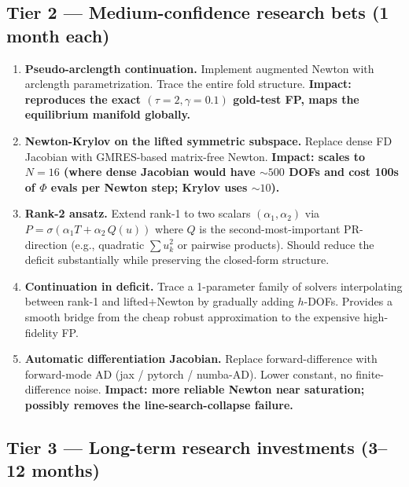 \documentclass[11pt]{article}
\begin{document}
\subsection{Tier 2 — Medium-confidence research bets (1 month each)}

\begin{enumerate}
\item \textbf{Pseudo-arclength continuation.} Implement augmented Newton with arclength
parametrization. Trace the entire fold structure. \textbf{Impact: reproduces the exact
$(\tau{=}2,\gamma{=}0.1)$ gold-test FP, maps the equilibrium manifold globally.}
\item \textbf{Newton-Krylov on the lifted symmetric subspace.} Replace dense FD
Jacobian with GMRES-based matrix-free Newton. \textbf{Impact: scales to $N=16$ (where
dense Jacobian would have $\sim 500$ DOFs and cost 100s of $\Phi$ evals per Newton step;
Krylov uses $\sim 10$).}
\item \textbf{Rank-2 ansatz.} Extend rank-1 to two scalars $(\alpha_1, \alpha_2)$ via
$P = \sigma(\alpha_1 T + \alpha_2\,Q(u))$ where $Q$ is the second-most-important
PR-direction (e.g., quadratic $\sum u_k^2$ or pairwise products). Should reduce the
deficit substantially while preserving the closed-form structure.
\item \textbf{Continuation in deficit.} Trace a 1-parameter family of solvers
interpolating between rank-1 and lifted+Newton by gradually adding $h$-DOFs. Provides
a smooth bridge from the cheap robust approximation to the expensive high-fidelity FP.
\item \textbf{Automatic differentiation Jacobian.} Replace forward-difference with
forward-mode AD (jax / pytorch / numba-AD). Lower constant, no finite-difference noise.
\textbf{Impact: more reliable Newton near saturation; possibly removes the
line-search-collapse failure.}
\end{enumerate}

\subsection{Tier 3 — Long-term research investments (3--12 months)}
\end{document}
